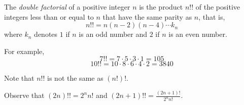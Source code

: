 \documentclass{article}
\begin{document}
The \emph{double factorial} of a positive integer $n$ is the product $n!!$ of the positive integers less than or equal to $n$ that have the same parity as $n$, that is,
\[n!! = n (n-2) (n-4)\cdots k_n\]
where $k_n$ denotes $1$ if $n$ is an odd number and $2$ if $n$ is an even number.

For example,
\[ 7!! = 7 \cdot 5 \cdot 3 \cdot 1 = 105 \]
\[ 10!! = 10\cdot 8\cdot 6\cdot 4\cdot 2 = 3840 \]

Note that $n!!$ is not the same as $(n!)!$.

Observe that $(2n)!! = 2^n n!$ and $(2n+1)!! = \frac{(2n+1)!}{2^n n!}$.
\end{document}
